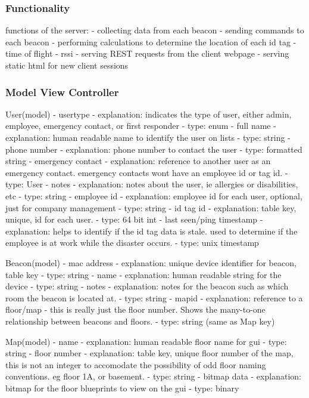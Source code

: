 

\subsubsection{Functionality}
functions of the server:
	- collecting data from each beacon
	- sending commands to each beacon
	- performing calculations to determine the location of each id tag
		- time of flight
		- rssi
	- serving REST requests from the client webpage
	- serving static html for new client sessions

\subsubsection{Model View Controller}

User(model)
	- usertype
		- explanation: indicates the type of user, either admin, employee, emergency contact, or first responder
		- type: enum
	- full name
		- explanation: human readable name to identify the user on lists
		- type: string
	- phone number
		- explanation: phone number to contact the user
		- type: formatted string
	- emergency contact
		- explanation: reference to another user as an emergency contact. emergency contacts wont have an employee id or tag id.
		- type: User
	- notes
		- explanation: notes about the user, ie allergies or disabilities, etc
		- type: string
	- employee id
		- explanation: employee id for each user, optional, just for company management
		- type: string
	- id tag id
		- explanation: table key, unique, id for each user.
		- type: 64 bit int
	- last seen/ping timestamp
		- explanation: helps to identify if the id tag data is stale. used to determine if the employee is at work while the disaster occurs.
		- type: unix timestamp

Beacon(model)
	- mac address
		- explanation: unique device identifier for beacon, table key
		- type: string
	- name
		- explanation: human readable string for the device
		- type: string
	- notes
		- explanation: notes for the beacon such as which room the beacon is located at.
		- type: string
	- mapid
		- explanation: reference to a floor/map - this is really just the floor number. Shows the many-to-one relationship between beacons and floors.
		- type: string (same as Map key)


Map(model)
	- name
		- explanation: human readable floor name for gui
		- type: string
	- floor number
		- explanation: table key, unique floor number of the map, this is not an integer to accomodate the possibility of odd floor naming conventions. eg floor 1A, or basement.
		- type: string
	- bitmap data
		- explanation: bitmap for the floor blueprints to view on the gui
		- type: binary


